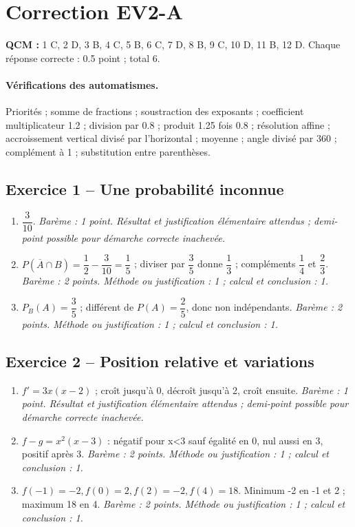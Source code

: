 \mxnewpage\section*{Correction EV2-A}\label{EV2-A-CORR}
\textbf{QCM :} 1 C, 2 D, 3 B, 4 C, 5 B, 6 C, 7 D, 8 B, 9 C, 10 D, 11 B, 12 D. Chaque réponse correcte : \num{0,5} point ; total 6.
\paragraph{Vérifications des automatismes.} Priorités ; somme de fractions ; soustraction des exposants ; coefficient multiplicateur \num{1,2} ; division par \num{0,8} ; produit \num{1,25} fois \num{0,8} ; résolution affine ; accroissement vertical divisé par l’horizontal ; moyenne ; angle divisé par 360 ; complément à 1 ; substitution entre parenthèses.
\subsection*{Exercice 1 -- Une probabilité inconnue}
\begin{enumerate}
\item $\dfrac{3}{10}$. \textit{Barème : 1 point. Résultat et justification élémentaire attendus ; demi-point possible pour démarche correcte inachevée.}
\item $P(\overline A\cap B)=\dfrac{1}{2}-\dfrac{3}{10}=\dfrac{1}{5}$ ; diviser par $\dfrac{3}{5}$ donne $\dfrac{1}{3}$ ; compléments $\dfrac{1}{4}$ et $\dfrac{2}{3}$. \textit{Barème : 2 points. Méthode ou justification : 1 ; calcul et conclusion : 1.}
\item $P_B(A)=\dfrac{3}{5}$ ; différent de $P(A)=\dfrac{2}{5}$, donc non indépendants. \textit{Barème : 2 points. Méthode ou justification : 1 ; calcul et conclusion : 1.}
\end{enumerate}
\subsection*{Exercice 2 -- Position relative et variations}
\begin{enumerate}
\item $f\prime=3x(x-2)$ ; croît jusqu’à 0, décroît jusqu’à 2, croît ensuite. \textit{Barème : 1 point. Résultat et justification élémentaire attendus ; demi-point possible pour démarche correcte inachevée.}
\item $f-g=x^2(x-3)$ : négatif pour x<3 sauf égalité en 0, nul aussi en 3, positif après 3. \textit{Barème : 2 points. Méthode ou justification : 1 ; calcul et conclusion : 1.}
\item $f(-1)=-2,f(0)=2,f(2)=-2,f(4)=18$. Minimum -2 en -1 et 2 ; maximum 18 en 4. \textit{Barème : 2 points. Méthode ou justification : 1 ; calcul et conclusion : 1.}
\end{enumerate}
